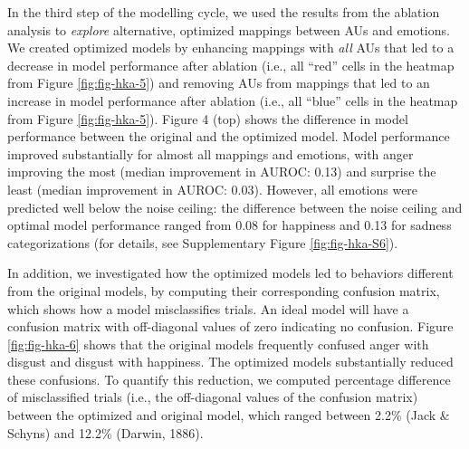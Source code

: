 \documentclass[12pt,american,a4paper,oneside,]{memoir} %
\begin{document}
In the third step of the modelling cycle, we used the results from the ablation analysis to \emph{explore} alternative, optimized mappings between AUs and emotions. We created optimized models by enhancing mappings with \emph{all} AUs that led to a decrease in model performance after ablation (i.e., all ``red'' cells in the heatmap from Figure \ref{fig:fig-hka-5}) and removing AUs from mappings that led to an increase in model performance after ablation (i.e., all ``blue'' cells in the heatmap from Figure \ref{fig:fig-hka-5}). Figure 4 (top) shows the difference in model performance between the original and the optimized model. Model performance improved substantially for almost all mappings and emotions, with anger improving the most (median improvement in AUROC: 0.13) and surprise the least (median improvement in AUROC: 0.03). However, all emotions were predicted well below the noise ceiling: the difference between the noise ceiling and optimal model performance ranged from 0.08 for happiness and 0.13 for sadness categorizations (for details, see Supplementary Figure \ref{fig:fig-hka-S6}).

In addition, we investigated how the optimized models led to behaviors different from the original models, by computing their corresponding confusion matrix, which shows how a model misclassifies trials. An ideal model will have a confusion matrix with off-diagonal values of zero indicating no confusion. Figure \ref{fig:fig-hka-6} shows that the original models frequently confused anger with disgust and disgust with happiness. The optimized models substantially reduced these confusions. To quantify this reduction, we computed percentage difference of misclassified trials (i.e., the off-diagonal values of the confusion matrix) between the optimized and original model, which ranged between 2.2\% (Jack \& Schyns) and 12.2\% (Darwin, 1886).
\end{document}
